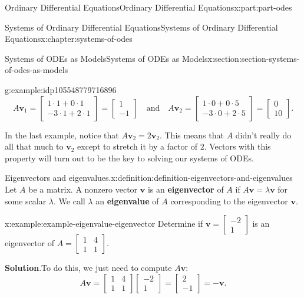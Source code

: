 \documentclass[oneside,10pt,]{book}
\newcommand{\blocktitlefont}{\relax}
\newcommand{\terminology}[1]{\textbf{#1}}
\numberwithin{equation}{part}
\renewcommand{\vec}[1]{\mathbf{#1}}
\newcommand{\amp}{&}
\begin{document}
\begin{partptx}{Ordinary Differential Equations}{}{Ordinary Differential Equations}{}{}{x:part:part-odes}
\begin{chapterptx}{Systems of Ordinary Differential Equations}{}{Systems of Ordinary Differential Equations}{}{}{x:chapter:systems-of-odes}
\begin{sectionptx}{Systems of ODEs as Models}{}{Systems of ODEs as Models}{}{}{x:section:section-systems-of-odes-as-models}
\begin{example}{}{g:example:idp105548779716896}
\begin{equation*}
A\vec{v}_{1} = \begin{bmatrix}1\cdot1+0\cdot1\\-3\cdot1+2\cdot1\end{bmatrix} = \begin{bmatrix}1\\-1\end{bmatrix}\quad\text{and}\quad A\vec{v}_{2} = \begin{bmatrix}1\cdot0+0\cdot5\\-3\cdot0+2\cdot5\end{bmatrix} = \begin{bmatrix}0\\10\end{bmatrix}.
\end{equation*}
%
\end{example}
In the last example, notice that \(A\vec{v}_{2} = 2\vec{v}_{2}\). This means that \(A\) didn't really do all that much to \(\vec{v}_{2}\) except to stretch it by a factor of \(2\). Vectors with this property will turn out to be the key to solving our systems of ODEs.%
\begin{definition}{Eigenvectors and eigenvalues.}{x:definition:definition-eigenvectors-and-eigenvalues}%
Let \(A\) be a matrix. A nonzero vector \(\vec{v}\) is an \terminology{eigenvector} of \(A\) if \(A\vec{v} = \lambda\vec{v}\) for some scalar \(\lambda\). We call \(\lambda\) an \terminology{eigenvalue} of \(A\) corresponding to the eigenvector \(\vec{v}\).%
\end{definition}
\begin{example}{}{x:example:example-eigenvalue-eigenvector}%
Determine if \(\vec{v} = \begin{bmatrix}-2\\1\end{bmatrix}\) is an eigenvector of \(A = \begin{bmatrix}1\amp4\\1\amp1\end{bmatrix}\).%
\par\smallskip%
\noindent\textbf{\blocktitlefont Solution}.\hypertarget{g:solution:idp105548779662112}{}\quad{}To do this, we just need to compute \(A\vec{v}:\)%
\begin{equation*}
A\vec{v} = \begin{bmatrix}1\amp4\\1\amp1\end{bmatrix}\begin{bmatrix}-2\\1\end{bmatrix} = \begin{bmatrix}2\\-1\end{bmatrix} = -\vec{v}.

\end{equation*}
\end{example}
\end{sectionptx}
\end{chapterptx}
\end{partptx}
\end{document}
